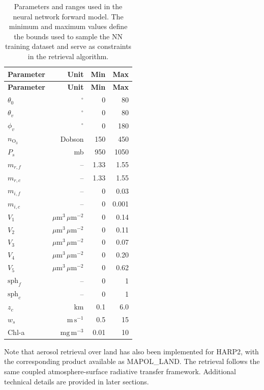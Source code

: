 \documentclass[
  letterpaper,
  open=any]{scrbook}
\begin{document}
\begin{longtable}[]{@{}lrrr@{}}
\caption{Parameters and ranges used in the neural network forward model.
The minimum and maximum values define the bounds used to sample the NN
training dataset and serve as constraints in the retrieval
algorithm.}\label{tbl-param-ranges}\tabularnewline
\toprule\noalign{}
\textbf{Parameter} & \textbf{Unit} & \textbf{Min} & \textbf{Max} \\
\midrule\noalign{}
\endfirsthead
\toprule\noalign{}
\textbf{Parameter} & \textbf{Unit} & \textbf{Min} & \textbf{Max} \\
\midrule\noalign{}
\endhead
\bottomrule\noalign{}
\endlastfoot
\(\theta_0\) & \(^\circ\) & 0 & 80 \\
\(\theta_v\) & \(^\circ\) & 0 & 80 \\
\(\phi_v\) & \(^\circ\) & 0 & 180 \\
\(n_{\mathrm{O}_3}\) & Dobson & 150 & 450 \\
\(P_s\) & mb & 950 & 1050 \\
\(m_{r,f}\) & -- & 1.33 & 1.55 \\
\(m_{r,c}\) & -- & 1.33 & 1.55 \\
\(m_{i,f}\) & -- & 0 & 0.03 \\
\(m_{i,c}\) & -- & 0 & 0.001 \\
\(V_1\) & \(\mu\mathrm{m}^3\,\mu\mathrm{m}^{-2}\) & 0 & 0.14 \\
\(V_2\) & \(\mu\mathrm{m}^3\,\mu\mathrm{m}^{-2}\) & 0 & 0.11 \\
\(V_3\) & \(\mu\mathrm{m}^3\,\mu\mathrm{m}^{-2}\) & 0 & 0.07 \\
\(V_4\) & \(\mu\mathrm{m}^3\,\mu\mathrm{m}^{-2}\) & 0 & 0.20 \\
\(V_5\) & \(\mu\mathrm{m}^3\,\mu\mathrm{m}^{-2}\) & 0 & 0.62 \\
\(\mathrm{sph}_f\) & -- & 0 & 1 \\
\(\mathrm{sph}_c\) & -- & 0 & 1 \\
\(z_c\) & km & 0.1 & 6.0 \\
\(w_s\) & \(\mathrm{m}\,\mathrm{s}^{-1}\) & 0.5 & 15 \\
Chl-a & \(\mathrm{mg}\,\mathrm{m}^{-3}\) & 0.01 & 10 \\
\end{longtable}

Note that aerosol retrieval over land has also been implemented for
HARP2, with the corresponding product available as MAPOL\_LAND. The
retrieval follows the same coupled atmosphere-surface radiative transfer
framework. Additional technical details are provided in later sections.
\end{document}
